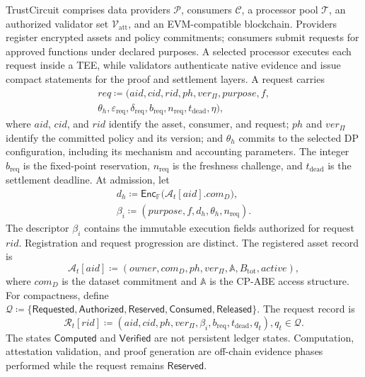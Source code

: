 \documentclass[10pt,journal,compsoc]{IEEEtran}
\begin{document}
TrustCircuit comprises data providers $\mathcal{P}$, consumers $\mathcal{C}$, a processor pool $\mathcal{T}$, an authorized validator set $\mathcal{V}_{\mathrm{att}}$, and an EVM-compatible blockchain. Providers register encrypted assets and policy commitments; consumers submit requests for approved functions under declared purposes. A selected processor executes each request inside a TEE, while validators authenticate native evidence and issue compact statements for the proof and settlement layers. A request carries
\begin{equation}
\begin{aligned}
req\coloneqq
(aid,cid,rid,ph,ver_{\Pi},purpose,f, \\
\theta_h,\varepsilon_{\mathrm{req}},\delta_{\mathrm{req}},
b_{\mathrm{req}},n_{\mathrm{req}},t_{\mathrm{dead}},\eta),
\end{aligned}
\end{equation}
where $aid$, $cid$, and $rid$ identify the asset, consumer, and request; $ph$ and $ver_{\Pi}$ identify the committed policy and its version; and $\theta_h$ commits to the selected DP configuration, including its mechanism and accounting parameters. The integer$b_{\mathrm{req}}$ is the fixed-point reservation, $n_{\mathrm{req}}$ is the freshness challenge, and $t_{\mathrm{dead}}$ is the settlement deadline. At admission, let
\begin{equation}
\begin{aligned}
d_h\coloneqq
\mathsf{Enc}_{\mathbb{F}}\bigl(\mathcal{A}_t[aid].com_D\bigr), \\
\beta_i\coloneqq
(purpose,f,d_h,\theta_h,n_{\mathrm{req}}).
\end{aligned}
\end{equation}
The descriptor $\beta_i$ contains the immutable execution fields authorized for request $rid$. Registration and request progression are distinct. The registered asset record is
\begin{equation}
\mathcal{A}_t[aid]\coloneqq
(owner,com_D,ph,ver_{\Pi},\mathbb{A},B_{\mathrm{tot}},active),
\label{eq:asset_record}
\end{equation}
where $com_D$ is the dataset commitment and $\mathbb{A}$ is the CP-ABE access structure. For compactness, define \( \mathcal{Q}\coloneqq \{\mathsf{Requested},\mathsf{Authorized},\mathsf{Reserved}, \mathsf{Consumed},\mathsf{Released}\}. \)
The request record is
\begin{equation}
\mathcal{R}_t[rid]\coloneqq
(aid,cid,ph,ver_{\Pi},\beta_i,
b_{\mathrm{req}},t_{\mathrm{dead}},q_t), q_t\in\mathcal{Q}.
\label{eq:request_record}
\end{equation}
The states $\mathsf{Computed}$ and $\mathsf{Verified}$ are not persistent ledger states. Computation, attestation validation, and proof generation are off-chain evidence phases performed while the request remains $\mathsf{Reserved}$.
\end{document}
